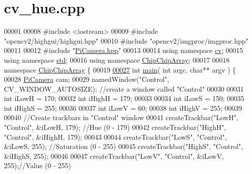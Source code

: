 \hypertarget{cv__hue_8cpp_source}{\section{cv\+\_\+hue.\+cpp}
\label{cv__hue_8cpp_source}
}

\begin{DoxyCode}
00001 
00008 \textcolor{preprocessor}{#include <iostream>}
00009 \textcolor{preprocessor}{#include "opencv2/highgui/highgui.hpp"}
00010 \textcolor{preprocessor}{#include "opencv2/imgproc/imgproc.hpp"}
00011 
00012 \textcolor{preprocessor}{#include "\hyperlink{PiCamera_8hpp}{PiCamera.hpp}"}
00013 
00014 \textcolor{keyword}{using namespace }\hyperlink{namespacecv}{cv};
00015 \textcolor{keyword}{using namespace }\hyperlink{namespacestd}{std};
00016 \textcolor{keyword}{using namespace }\hyperlink{namespaceChipChipArray}{ChipChipArray};
00017 
00018 \textcolor{keyword}{namespace }\hyperlink{namespaceChipChipArray}{ChipChipArray} \{
00019     
\hypertarget{cv__hue_8cpp_source_l00027}{}\hyperlink{namespaceChipChipArray_a7fc3d1edffca11531cd09fdab7c8b88d}{00027}     \textcolor{keywordtype}{int} \hyperlink{namespaceChipChipArray_a7fc3d1edffca11531cd09fdab7c8b88d}{main}( \textcolor{keywordtype}{int} argc, \textcolor{keywordtype}{char}** argv ) \{
00028         \hyperlink{classChipChipArray_1_1PiCamera}{PiCamera} cam;
00029         namedWindow(\textcolor{stringliteral}{"Control"}, CV\_WINDOW\_AUTOSIZE); \textcolor{comment}{//create a window called "Control"}
00030 
00031         \textcolor{keywordtype}{int} iLowH = 170;
00032         \textcolor{keywordtype}{int} iHighH = 179;
00033 
00034         \textcolor{keywordtype}{int} iLowS = 150; 
00035         \textcolor{keywordtype}{int} iHighS = 255;
00036 
00037         \textcolor{keywordtype}{int} iLowV = 60;
00038         \textcolor{keywordtype}{int} iHighV = 255;
00039 
00040         \textcolor{comment}{//Create trackbars in "Control" window}
00041         createTrackbar(\textcolor{stringliteral}{"LowH"}, \textcolor{stringliteral}{"Control"}, &iLowH, 179); \textcolor{comment}{//Hue (0 - 179)}
00042         createTrackbar(\textcolor{stringliteral}{"HighH"}, \textcolor{stringliteral}{"Control"}, &iHighH, 179);
00043 
00044         createTrackbar(\textcolor{stringliteral}{"LowS"}, \textcolor{stringliteral}{"Control"}, &iLowS, 255); \textcolor{comment}{//Saturation (0 - 255)}
00045         createTrackbar(\textcolor{stringliteral}{"HighS"}, \textcolor{stringliteral}{"Control"}, &iHighS, 255);
00046 
00047         createTrackbar(\textcolor{stringliteral}{"LowV"}, \textcolor{stringliteral}{"Control"}, &iLowV, 255);\textcolor{comment}{//Value (0 - 255)}

\end{DoxyCode}
